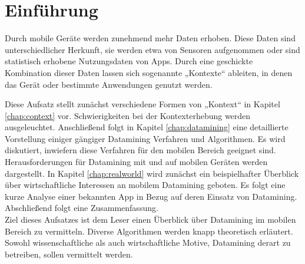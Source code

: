 \chapter{Einführung}

Durch mobile Geräte werden zunehmend mehr Daten erhoben. Diese Daten sind unterschiedlicher Herkunft, sie werden etwa von Sensoren aufgenommen oder sind statistisch erhobene Nutzungsdaten von Apps. Durch eine geschickte Kombination dieser Daten lassen sich sogenannte „Kontexte“ ableiten, in denen das Gerät oder bestimmte Anwendungen genutzt werden.

Diese Aufsatz stellt zunächst verschiedene Formen von „Kontext“ in Kapitel \ref{chap:context} vor. Schwierigkeiten bei der Kontexterhebung werden ausgeleuchtet. Anschließend folgt in Kapitel \ref{chap:datamining} eine detaillierte Vorstellung einiger gängiger Datamining Verfahren und Algorithmen. Es wird diskutiert, inwiefern diese Verfahren für den mobilen Bereich geeignet sind. Herausforderungen für Datamining mit und auf mobilen Geräten werden dargestellt. In Kapitel \ref{chap:realworld} wird zunächst ein beispielhafter Überblick über wirtschaftliche Interessen an mobilem Datamining geboten. Es folgt eine kurze Analyse einer bekannten App in Bezug auf deren Einsatz von Datamining. Abschließend folgt eine Zusammenfassung. \\

Ziel dieses Aufsatzes ist dem Leser einen Überblick über Datamining im mobilen Bereich zu vermitteln. Diverse Algorithmen werden knapp theoretisch erläutert. Sowohl wissenschaftliche als auch wirtschaftliche Motive, Datamining derart zu betreiben, sollen vermittelt werden.

\nocite{*}